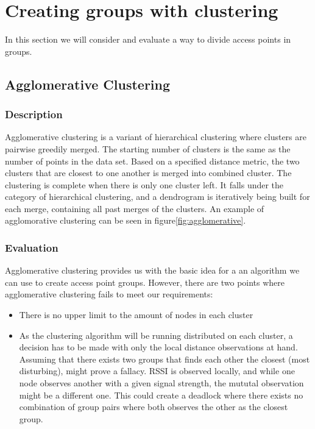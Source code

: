 \section{Creating groups with clustering}
In this section we will consider and evaluate a way to divide access points in groups.

\subsection {Agglomerative Clustering}
\subsubsection{Description}
Agglomerative clustering  \cite{agglomerative} is a variant of hierarchical clustering where clusters are pairwise greedily merged. The starting number of clusters is the same as the number of
points in the data set. Based on a specified distance metric, the two clusters that are closest to one another is merged into combined cluster. The clustering is complete
when there is only one cluster left. It falls under the category of hierarchical clustering, and a dendrogram is iteratively being built for each merge,
containing all past merges of the clusters. An example of agglomorative clustering can be seen in {{figure}}\ref{fig:agglomerative}.

\subsubsection{Evaluation}
Agglomerative clustering provides us with the basic idea for a an algorithm we can use to create access point groups. However, there are two points where agglomerative clustering
fails to meet our requirements: 
\begin{itemize}
	\item There is no upper limit to the amount of nodes in each cluster
	\item As the clustering algorithm will be running distributed  on each cluster, a decision has to be made with only the local distance observations at hand.
		Assuming that there exists two groups that finds each other the closest (most disturbing), might prove a fallacy. RSSI is observed locally, and while one node observes another with a given signal strength,
		the mututal observation might be a different one. This could create a deadlock where there exists no combination of group pairs where both observes the other
		as the closest group. 
\end{itemize}


